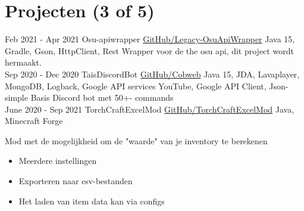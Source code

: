 \documentclass[letterpaper]{twentysecondcv} %
\begin{document}
\section{Projecten (3 of 5)}
\begin{twenty} %
	\twentyitem
    		{Feb 2021 -}
		{Apr 2021}
        		{Osu-apiwrapper}
        		{\href{https://github.com/Tais993/Legacy-OsuApiWrapper}{GitHub/Legacy-OsuApiWrapper}}
        		{Java 15, Gradle, Gson, HttpClient, Rest}
        		{Wrapper voor de the osu api, dit project wordt hermaakt.}\\
	\twentyitem
    		{Sep 2020 -}
		{Dec 2020}
        		{TaisDiscordBot}
        		{\href{https://github.com/Tais993/taisdiscordbot}{GitHub/Cobweb}}
        		{Java 15, JDA, Lavaplayer, MongoDB, Logback, Google API services YouTube, Google API Client, Json-simple}
        		{Basis Discord bot met 50+- commands}\\
	\twentyitem
    		{June 2020 -}
		{Sep 2021}
        		{TorchCraftExcelMod}
        		{\href{https://github.com/Tais993/TorchCraftExcelMod}{GitHub/TorchCraftExcelMod}}
        		{Java, Minecraft Forge}
        		{
        		Mod met de mogelijkheid om de "waarde" van je inventory te berekenen
        		\begin{itemize}
        			\item Meerdere instellingen
        			\item Exporteren naar csv-bestanden
        			\item Het laden van item data kan via configs
        		\end{itemize}}\\
\end{twenty}
\end{document}
